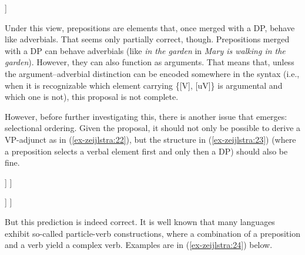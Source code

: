 \documentclass[output=paper
,modfonts
,nonflat]{langsci/langscibook}
\begin{document}
	\begin{exe}
\ex
			\begin{forest}	
				[PP{=}\{{[}V{]}{,} {[}uV{]}\}
				[P{=}\{{[}V{]}{,} {[}uV{]}{,} {[}uD{]}\}]
				[DP{=}\{{[}D{]}\}] ]
		\end{forest}
	\end{exe} 
\noindent Under this view, prepositions are elements that, once merged with a DP, behave like adverbials. That seems only partially correct, though. Prepositions merged with a DP can behave adverbials (like \textit{in the garden} in \textit{Mary is walking in the garden}). However, they can also function as arguments. That means that, unless the argument–adverbial distinction can be encoded somewhere in the syntax (i.e., when it is recognizable which element carrying \{[V], [uV]\} is argumental and which one is not), this proposal is not complete. 

However, before further investigating this, there is another issue that emerges: selectional ordering. Given the proposal, it should not only be possible to derive a VP-adjunct as in (\ref{ex-zeijlstra:22}), but the structure in (\ref{ex-zeijlstra:23}) (where a preposition selects a verbal element first and only then a DP) should also be fine.

\begin{multicols}{2}\begin{exe}
\ex\label{ex-zeijlstra:22}%
			\begin{forest}	
				[VP{=}\{{[}V{]}{,} {[}uV{]}\}
				[VP{=}\{{[}V{]}\}]
				[PP{=}\{{[}V{]}{,} {[}uV{]}\}
				[P{=}\{{[}V{]}{,} {[}uV{]}{,} {[}uD{]}\}]
				[DP{=}\{{[}D{]}\}] ] ]
		\end{forest}

		\ex\label{ex-zeijlstra:23}%
			\begin{forest}	
				[VP{=}\{{[}V{]}\}
				[DP{=}\{{[}D{]}\}]
				[V'{=}\{{[}V{]}{,} {[}uD{]}\}
				[P{=}\{{[}V{]}{,} {[}uV{]}{,} {[}uD{]}\}]
				[V{=}\{{[}V{]}\}] ] ]
		\end{forest}
	\end{exe}\end{multicols}
\noindent But this prediction is indeed correct. It is well known that many languages exhibit so-called particle-verb constructions, where a combination of a preposition and a verb yield a complex verb. Examples are in (\ref{ex-zeijlstra:24}) below.
\end{document}
